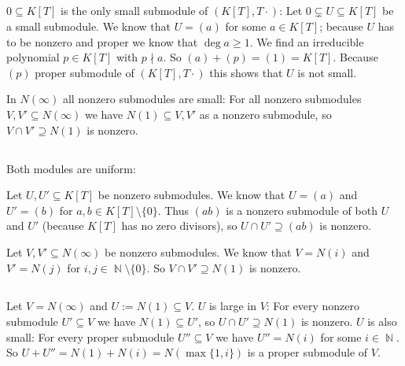 \documentclass[a4paper,10pt]{article}
\theoremstyle{definition}
\newcommand{\N}{\operatorname{\mathbb{N}}}
\begin{document}
\subsection{}
$0 \subseteq K[T]$ is the only small submodule of $(K[T],T\cdot)$: Let $0 \subsetneq U \subseteq K[T]$ be a small submodule. We know that $U = (a)$ for some $a \in K[T]$; because $U$ has to be nonzero and proper we know that $\deg a \geq 1$. We find an irreducible polynomial $p \in K[T]$ with $p \nmid a$. So $(a) + (p) = (1) = K[T]$. Because $(p)$ proper submodule of $(K[T],T\cdot)$ this shows that $U$ is not small.

In $N(\infty)$ all nonzero submodules are small: For all nonzero submodules $V, V' \subseteq N(\infty)$ we have $N(1) \subseteq V, V'$ as a nonzero submodule, so $V \cap V' \supseteq N(1)$ is nonzero.

\subsection{}
Both modules are uniform:

Let $U, U' \subseteq K[T]$ be nonzero submodules. We know that $U = (a)$ and $U' = (b)$ for $a,b \in K[T] \setminus \{0\}$. Thus $(ab)$ is a nonzero submodule of both $U$ and $U'$ (because $K[T]$ has no zero divisors), so $U \cap U' \supseteq (ab)$ is nonzero.

Let $V, V' \subseteq N(\infty)$ be nonzero submodules. We know that $V = N(i)$ and $V' = N(j)$ for $i,j \in \N \setminus \{0\}$. So $V \cap V' \supseteq N(1)$ is nonzero.

\subsection{}
Let $V = N(\infty)$ and $U := N(1) \subseteq V$. $U$ is large in $V$: For every nonzero submodule $U' \subseteq V$ we have $N(1) \subseteq U'$, so $U \cap U' \supseteq N(1)$ is nonzero. $U$ is also small: For every proper submodule $U'' \subseteq V$ we have $U'' = N(i)$ for some $i \in \N$. So $U + U'' = N(1) + N(i) = N(\max\{1,i\})$ is a proper submodule of $V$.
\end{document}
